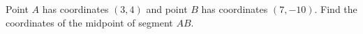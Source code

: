 Point $A$ has coordinates $(3,4)$ and point $B$ has coordinates $(7,-10)$. Find the coordinates of the midpoint of segment $AB$.
